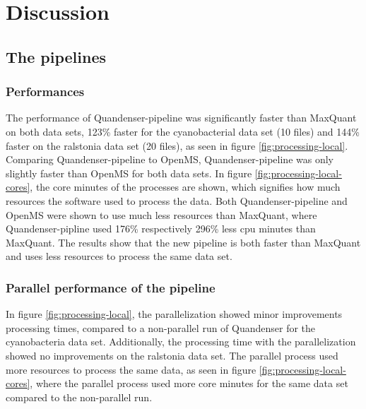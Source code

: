 \section{Discussion}

\subsection{The pipelines}

\subsubsection{Performances}
The performance of Quandenser-pipeline was significantly faster than MaxQuant on both data sets, 123\% faster for the cyanobacterial data set (10 files) and 144\% faster on the ralstonia data set (20 files), as seen in figure \ref{fig:processing-local}. Comparing Quandenser-pipeline to OpenMS, Quandenser-pipeline was only slightly faster than OpenMS for both data sets. In figure \ref{fig:processing-local-cores}, the core minutes of the processes are shown, which signifies how much resources the software used to process the data. Both Quandenser-pipeline and OpenMS were shown to use much less resources than MaxQuant, where Quandenser-pipline used 176\% respectively 296\% less cpu minutes than MaxQuant. The results show that the new pipeline is both faster than MaxQuant and uses less resources to process the same data set.

\subsubsection{Parallel performance of the pipeline}
In figure \ref{fig:processing-local}, the parallelization showed minor improvements processing times, compared to a non-parallel run of Quandenser for the cyanobacteria data set. Additionally, the processing time with the parallelization showed no improvements on the ralstonia data set. The parallel process used more resources to process the same data, as seen in figure \ref{fig:processing-local-cores}, where the parallel process used more core minutes for the same data set compared to the non-parallel run.

